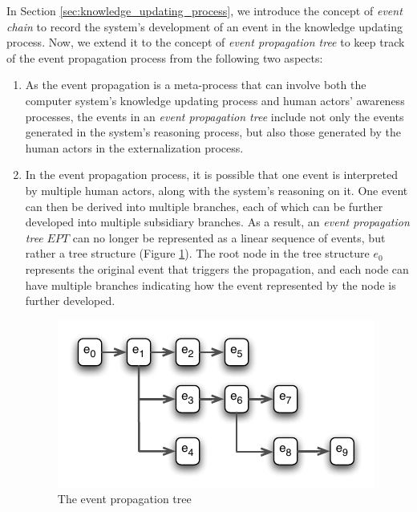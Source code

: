 In Section \ref{sec:knowledge_updating_process}, we introduce the concept of \emph{event chain} to record the system's development of an event in the knowledge updating process. Now, we extend it to the concept of \emph{event propagation tree} to keep track of the event propagation process from the following two aspects:

\begin{enumerate}
	\item As the event propagation is a meta-process that can involve both the computer system's knowledge updating process and human actors' awareness processes, the events in an \emph{event propagation tree} include not only the events generated in the system's reasoning process, but also those generated by the human actors in the externalization process.
	\item In the event propagation process, it is possible that one event is interpreted by multiple human actors, along with the system's reasoning on it. One event can then be derived into multiple branches, each of which can be further developed into multiple subsidiary branches. As a result, an \emph{event propagation tree} $EPT$ can no longer be represented as a linear sequence of events, but rather a tree structure (Figure \ref{fig:event_propagation_tree}). The root node in the tree structure $e_0$ represents the original event that triggers the propagation, and each node can have multiple branches indicating how the event represented by the node is further developed.
	\begin{figure}[htbp] %
		\centering
		\includegraphics{event_propagation_tree.pdf} 
		\caption{The event propagation tree}
		\label{fig:event_propagation_tree}
	\end{figure}
\end{enumerate}

